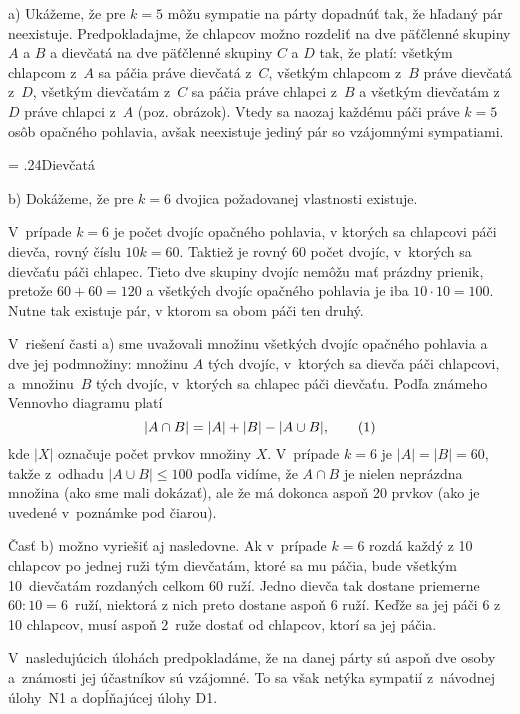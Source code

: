 ﻿{%
a) Ukážeme, že pre $k=5$ môžu sympatie na párty dopadnúť tak,
že hľadaný pár neexistuje. Predpokladajme, že chlapcov možno
rozdeliť na dve päťčlenné skupiny $A$ a $B$ a dievčatá na dve
päťčlenné skupiny $C$ a $D$ tak, že platí: všetkým chlapcom z~$A$
sa páčia práve dievčatá z~$C$, všetkým chlapcom z~$B$ práve dievčatá z~$D$,
všetkým dievčatám z~$C$ sa páčia práve chlapci z~$B$ a všetkým dievčatám
z~$D$ práve chlapci z~$A$ (poz. obrázok).
Vtedy sa naozaj každému páči práve $k=5$ osôb opačného pohlavia,
avšak neexistuje jediný pár so vzájomnými sympatiami.
\medskip
\centerline{=\hbox{}%
             \raise .24\hbox{Dievčatá}\hskip 12pt
             }
\medskip

b) Dokážeme, že pre $k=6$ dvojica požadovanej vlastnosti
existuje.

V~prípade $k=6$ je počet dvojíc opačného pohlavia,
v ktorých sa chlapcovi páči dievča, rovný číslu
$10k = 60$. Taktiež je rovný 60 počet dvojíc, v~ktorých
sa dievčaťu páči chlapec. Tieto dve skupiny dvojíc
nemôžu mať prázdny prienik, pretože $60+60=120$ a všetkých dvojíc
opačného pohlavia je iba $10\cdot10=100$. Nutne
tak existuje pár, v ktorom sa obom páči ten
druhý.

\poznamka
V~riešení časti a) sme uvažovali množinu všetkých dvojíc
opačného pohlavia a dve jej podmnožiny: množinu $A$
tých dvojíc, v~ktorých sa dievča páči chlapcovi, a~množinu~$B$ tých dvojíc, v~ktorých sa chlapec páči dievčaťu.
Podľa známeho Vennovho diagramu platí
$$
|A\cap B|=|A|+|B|-|A\cup B|,
\tag1
$$
kde $|X|$ označuje počet prvkov množiny $X$. V~prípade $k=6$ je
$|A|=|B|=60$, takže z~odhadu $|A\cup B|\le100$
podľa  vidíme, že $A\cap B$ je nielen neprázdna množina
(ako sme mali dokázať), ale že má dokonca aspoň 20 prvkov
(ako je uvedené v~poznámke pod čiarou).

\ineriesenie
Časť b) možno vyriešiť aj nasledovne.
Ak v~prípade $k=6$ rozdá každý z 10
chlapcov po jednej ruži tým dievčatám, ktoré sa mu páčia,
bude všetkým 10~dievčatám rozdaných celkom $60$ ruží.
Jedno dievča tak dostane priemerne $60 : 10 = 6$~ruží,
niektorá z nich preto dostane aspoň 6 ruží.
Keďže sa jej páči 6 z 10 chlapcov,
musí aspoň 2~ruže dostať od chlapcov, ktorí sa jej páčia.

{\everypar{}
\smallskip
V~nasledujúcich úlohách predpokladáme, že na danej párty sú
aspoň dve osoby a~známosti jej účastníkov sú vzájomné. To
sa však netýka sympatií z~návodnej úlohy~N1 a dopĺňajúcej
úlohy D1.
\smallskip
}

}
